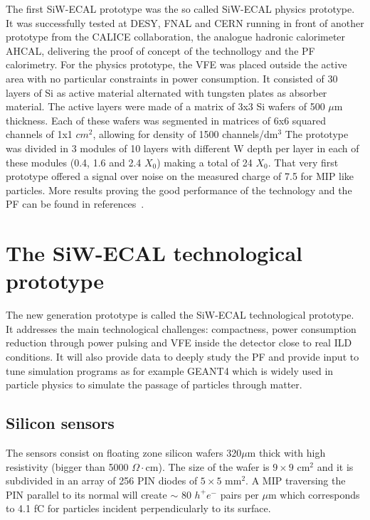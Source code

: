 \documentclass[a4paper,11pt]{article}
\begin{document}
The first SiW-ECAL prototype was the so called SiW-ECAL physics prototype.
It was successfully tested at DESY, FNAL and CERN running in front of another prototype from the CALICE
collaboration, the analogue hadronic calorimeter AHCAL, delivering the proof of concept of the technollogy
and the PF calorimetry.
For the physics prototype, the VFE was placed outside the active area with no particular constraints in power consumption.
It consisted of 30 layers of Si as active material alternated with tungsten plates as absorber material.
The active layers were made of a matrix of 3x3 Si wafers of 500 $\mu$m thickness. Each of these wafers was segmented in matrices of
6x6 squared channels of 1x1 $cm^{2}$, allowing for density of 1500 channels/dm$^{3}$
The prototype was divided in 3 modules of 10 layers with different W depth per layer in each of these modules
(0.4, 1.6 and 2.4 $X_{0}$) making a total of 24 $X_{0}$.
That very first prototype offered a signal over noise on the measured charge of 7.5 for MIP like 
particles. More results proving the good performance of the technology and the PF can be found in
references~\cite{Adloff:2011ha,Anduze:2008hq,Adloff:2008aa,Adloff:2010xj,CALICE:2011aa,Bilki:2014uep}. 

\section{The SiW-ECAL technological prototype}


The new generation prototype is called the SiW-ECAL technological prototype. It addresses the main technological challenges: compactness,
power consumption reduction through power pulsing and VFE inside the detector close to real ILD conditions.
It will also provide data to deeply study the PF and provide input to tune simulation programs as for example
GEANT4\cite{Agostinelli:2002hh,Allison:2006ve,Allison:2016lfl} which is widely used
in particle physics to simulate the passage of particles through matter.

\subsection{Silicon sensors}
\label{sec:wafers}

The sensors consist on floating zone silicon wafers 320$\mu$m thick with high resistivity (bigger than 5000 $\Omega\cdot$cm).
The size of the wafer is $9\times9$ cm$^{2}$ and it is subdivided in an array of 256 PIN diodes of $5\times5$ mm$^{2}$.
A MIP traversing the PIN parallel to its normal will create $\sim$ 80 $h^{+}e^{-}$ pairs per $\mu$m which corresponds to 4.1 fC
for particles incident perpendicularly to its surface.
\end{document}
